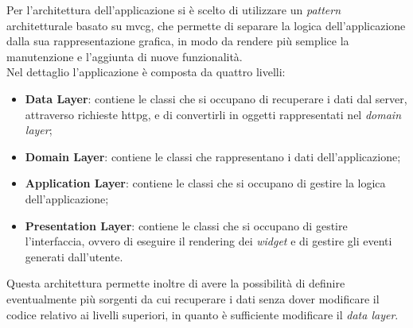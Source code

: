 Per l'architettura dell'applicazione si è scelto di utilizzare un \emph{pattern} architetturale basato su \gls{mvcg}\glsoccur, che permette di separare la logica dell'applicazione dalla sua rappresentazione grafica, in modo da rendere più semplice la manutenzione e l'aggiunta di nuove funzionalità.\\
Nel dettaglio l'applicazione è composta da quattro livelli:
\begin{itemize}
    \item \textbf{Data Layer}: contiene le classi che si occupano di recuperare i dati dal server, attraverso richieste \gls{httpg}\glsoccur, e di convertirli in oggetti rappresentati nel \emph{domain layer};
    \item \textbf{Domain Layer}: contiene le classi che rappresentano i dati dell'applicazione;
    \item \textbf{Application Layer}: contiene le classi che si occupano di gestire la logica dell'applicazione;
    \item \textbf{Presentation Layer}: contiene le classi che si occupano di gestire l'interfaccia, ovvero di eseguire il rendering dei \emph{widget} e di gestire gli eventi generati dall'utente.
\end{itemize}
Questa architettura permette inoltre di avere la possibilità di definire eventualmente più sorgenti da cui recuperare i dati senza dover modificare il codice relativo ai livelli superiori, in quanto è sufficiente modificare il \emph{data layer}\cite{site:app-architecture}.\\

